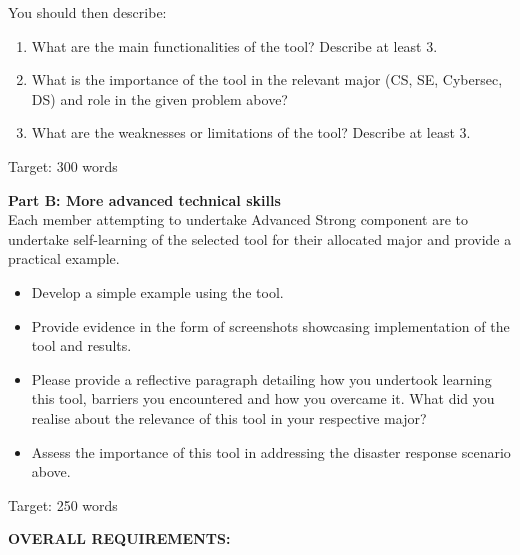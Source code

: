 \documentclass[a4paper, 11pt]{report}
\begin{document}
You should then describe:
\begin{enumerate}
    \item What are the main functionalities of the tool? Describe at least 3.
    \item What is the importance of the tool in the relevant major (CS, SE, Cybersec, DS) and role in the given problem above?
    \item What are the weaknesses or limitations of the tool? Describe at least 3.
\end{enumerate}
Target: 300 words

\vspace{4ex}

\textbf{Part B: More advanced technical skills}\\

Each member attempting to undertake Advanced Strong component are to undertake self-learning of the selected tool for their allocated major and provide a practical example.

\begin{itemize}
    \item Develop a simple example using the tool.
    \item Provide evidence in the form of screenshots showcasing implementation of the tool and results.
    \item Please provide a reflective paragraph detailing how you undertook learning this tool, barriers you encountered and how you overcame it. What did you realise about the relevance of this tool in your respective major?
    \item Assess the importance of this tool in addressing the disaster response scenario above.
\end{itemize}

Target: 250 words

\vspace{6ex}

\textbf{OVERALL REQUIREMENTS:}
\end{document}
